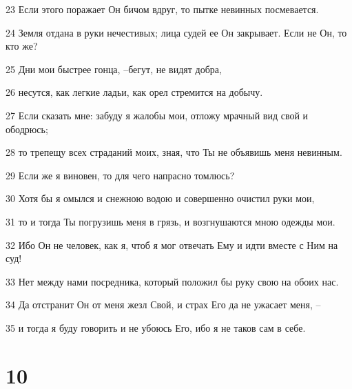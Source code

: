 \par 23 Если этого поражает Он бичом вдруг, то пытке невинных посмевается.
\par 24 Земля отдана в руки нечестивых; лица судей ее Он закрывает. Если не Он, то кто же?
\par 25 Дни мои быстрее гонца, --бегут, не видят добра,
\par 26 несутся, как легкие ладьи, как орел стремится на добычу.
\par 27 Если сказать мне: забуду я жалобы мои, отложу мрачный вид свой и ободрюсь;
\par 28 то трепещу всех страданий моих, зная, что Ты не объявишь меня невинным.
\par 29 Если же я виновен, то для чего напрасно томлюсь?
\par 30 Хотя бы я омылся и снежною водою и совершенно очистил руки мои,
\par 31 то и тогда Ты погрузишь меня в грязь, и возгнушаются мною одежды мои.
\par 32 Ибо Он не человек, как я, чтоб я мог отвечать Ему и идти вместе с Ним на суд!
\par 33 Нет между нами посредника, который положил бы руку свою на обоих нас.
\par 34 Да отстранит Он от меня жезл Свой, и страх Его да не ужасает меня, --
\par 35 и тогда я буду говорить и не убоюсь Его, ибо я не таков сам в себе.

\chapter{10}

